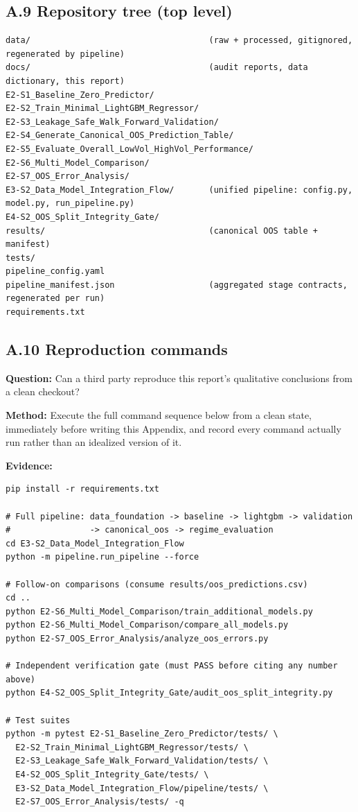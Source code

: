 \documentclass[11pt]{article}
\newcommand{\qbox}[1]{\par\noindent\textbf{Question:} #1\par}
\newcommand{\methodbox}[1]{\par\noindent\textbf{Method:} #1\par}
\begin{document}
\subsection*{A.9 Repository tree (top level)}

\begin{lstlisting}
data/                                    (raw + processed, gitignored, regenerated by pipeline)
docs/                                    (audit reports, data dictionary, this report)
E2-S1_Baseline_Zero_Predictor/
E2-S2_Train_Minimal_LightGBM_Regressor/
E2-S3_Leakage_Safe_Walk_Forward_Validation/
E2-S4_Generate_Canonical_OOS_Prediction_Table/
E2-S5_Evaluate_Overall_LowVol_HighVol_Performance/
E2-S6_Multi_Model_Comparison/
E2-S7_OOS_Error_Analysis/
E3-S2_Data_Model_Integration_Flow/       (unified pipeline: config.py, model.py, run_pipeline.py)
E4-S2_OOS_Split_Integrity_Gate/
results/                                 (canonical OOS table + manifest)
tests/
pipeline_config.yaml
pipeline_manifest.json                   (aggregated stage contracts, regenerated per run)
requirements.txt
\end{lstlisting}

\subsection*{A.10 Reproduction commands}

\qbox{Can a third party reproduce this report's qualitative conclusions from a clean checkout?}

\methodbox{Execute the full command sequence below from a clean state, immediately before writing this Appendix, and record every command actually run rather than an idealized version of it.}

\par\noindent\textbf{Evidence:}\par
\begin{lstlisting}
pip install -r requirements.txt

# Full pipeline: data_foundation -> baseline -> lightgbm -> validation
#                -> canonical_oos -> regime_evaluation
cd E3-S2_Data_Model_Integration_Flow
python -m pipeline.run_pipeline --force

# Follow-on comparisons (consume results/oos_predictions.csv)
cd ..
python E2-S6_Multi_Model_Comparison/train_additional_models.py
python E2-S6_Multi_Model_Comparison/compare_all_models.py
python E2-S7_OOS_Error_Analysis/analyze_oos_errors.py

# Independent verification gate (must PASS before citing any number above)
python E4-S2_OOS_Split_Integrity_Gate/audit_oos_split_integrity.py

# Test suites
python -m pytest E2-S1_Baseline_Zero_Predictor/tests/ \
  E2-S2_Train_Minimal_LightGBM_Regressor/tests/ \
  E2-S3_Leakage_Safe_Walk_Forward_Validation/tests/ \
  E4-S2_OOS_Split_Integrity_Gate/tests/ \
  E3-S2_Data_Model_Integration_Flow/pipeline/tests/ \
  E2-S7_OOS_Error_Analysis/tests/ -q
\end{lstlisting}
\end{document}
